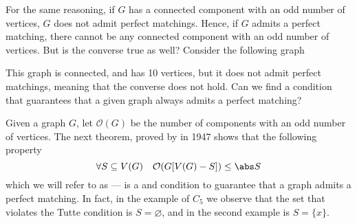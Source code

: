 \documentclass[a4paper, 12pt]{report}
\begin{document}
    For the same reasoning, if $G$ has a connected component with an odd number of vertices, $G$ does not admit perfect matchings. Hence, if $G$ admits a perfect matching, there cannot be any connected component with an odd number of vertices. But is the converse true as well? Consider the following graph

    \begin{figure}[H]
        \centering
    \end{figure}

    This graph is connected, and has 10 vertices, but it does not admit perfect matchings, meaning that the converse does not hold. Can we find a condition that guarantees that a given graph always admits a perfect matching?

    Given a graph $G$, let $\mathcal O (G)$ be the number of components with an odd number of vertices. The next theorem, proved by \textcite{tutte} in 1947 shows that the following property $$\forall S \subseteq V(G) \quad \mathcal O(G[V(G) - S]) \le \abs S$$ which we will refer to as  --- is a  and  condition to guarantee that a graph admits a perfect matching. In fact, in the example of $C_5$ we observe that the set that violates the Tutte condition is $S = \varnothing$, and in the second example is $S = \{x\}$.
\end{document}
